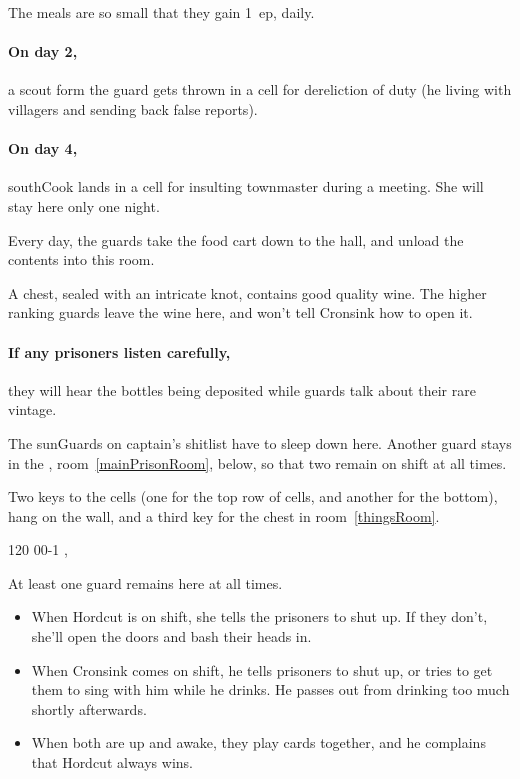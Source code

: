 \begin{multicols}{2}
The meals are so small that they gain 1~\gls{ep}, daily.

\paragraph{On day 2,}
a scout form the \gls{guard} gets thrown in a cell for dereliction of duty (he living with villagers and sending back false reports).

\paragraph{On day 4,}
\gls{southCook} lands in a cell for insulting \gls{townmaster} during a meeting.
She will stay here only one night.


Every day, the guards take the food cart down to the hall, and unload the contents into this room.

A chest, sealed with an intricate knot, contains good quality wine.
The higher ranking guards leave the wine here, and won't tell Cronsink how to open it.

\paragraph{If any prisoners listen carefully,}
they will hear the bottles being deposited while guards talk about their rare vintage.


The \glspl{sunGuard} on \gls{captain}'s shitlist have to sleep down here.
Another guard stays in the , room~\ref{mainPrisonRoom}, below, so that two remain on shift at all times.

Two keys to the cells (one for the top row of cells, and another for the bottom), hang on the wall, and a third key for the chest in room~\ref{thingsRoom}.

%
  {{1}{2}{0}}%
  {{0}{0}{-1}}%
  {%
    \shortsword
    \partialplate
  }%
  {\brawler, \berserker}%
  {\lootSmall}%
  {}%


At least one guard remains here at all times.
\begin{itemize}
  \item
  When Hordcut is on shift, she tells the prisoners to shut up.
  If they don't, she'll open the doors and bash their heads in.
  \item
  When Cronsink comes on shift, he tells prisoners to shut up, or tries to get them to sing with him while he drinks.
  He passes out from drinking too much shortly afterwards.
  \item
  When both are up and awake, they play cards together, and he complains that Hordcut always wins.
\end{itemize}


\end{multicols}
